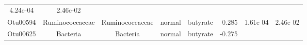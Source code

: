 \documentclass[11pt,]{article}
\begin{document}
\begin{longtable}[]{@{}cccccccc@{}}
\begin{minipage}[t]{0.08\columnwidth}
4.24e-04\strut
\end{minipage} & \begin{minipage}[t]{0.08\columnwidth}\centering\strut
2.46e-02\strut
\end{minipage}\tabularnewline
\begin{minipage}[t]{0.08\columnwidth}\centering\strut
Otu00594\strut
\end{minipage} & \begin{minipage}[t]{0.15\columnwidth}\centering\strut
Ruminococcaceae\strut
\end{minipage} & \begin{minipage}[t]{0.15\columnwidth}\centering\strut
Ruminococcaceae\strut
\end{minipage} & \begin{minipage}[t]{0.08\columnwidth}\centering\strut
normal\strut
\end{minipage} & \begin{minipage}[t]{0.09\columnwidth}\centering\strut
butyrate\strut
\end{minipage} & \begin{minipage}[t]{0.07\columnwidth}\centering\strut
-0.285\strut
\end{minipage} & \begin{minipage}[t]{0.08\columnwidth}\centering\strut
1.61e-04\strut
\end{minipage} & \begin{minipage}[t]{0.08\columnwidth}\centering\strut
2.46e-02\strut
\end{minipage}\tabularnewline
\begin{minipage}[t]{0.08\columnwidth}\centering\strut
Otu00625\strut
\end{minipage} & \begin{minipage}[t]{0.15\columnwidth}\centering\strut
Bacteria\strut
\end{minipage} & \begin{minipage}[t]{0.15\columnwidth}\centering\strut
Bacteria\strut
\end{minipage} & \begin{minipage}[t]{0.08\columnwidth}\centering\strut
normal\strut
\end{minipage} & \begin{minipage}[t]{0.09\columnwidth}\centering\strut
butyrate\strut
\end{minipage} & \begin{minipage}[t]{0.07\columnwidth}\centering\strut
-0.275\strut
\end{minipage} & \begin{minipage}[t]{0.08\columnwidth}\centering\strut

\end{minipage}
\end{longtable}
\end{document}
